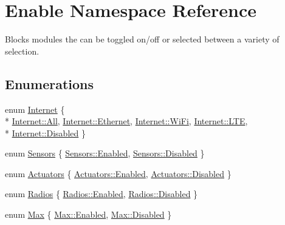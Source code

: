 \hypertarget{namespace_enable}{}\section{Enable Namespace Reference}
\label{namespace_enable}


Blocks modules the can be toggled on/off or selected between a variety of selection.  


\subsection*{Enumerations}
\begin{DoxyCompactItemize}
\item 
enum \hyperlink{namespace_enable_af24aafc1e3ae44b565ff729a2ef16a39}{Internet} \{ \\*
\hyperlink{namespace_enable_af24aafc1e3ae44b565ff729a2ef16a39ab1c94ca2fbc3e78fc30069c8d0f01680}{Internet\+::\+All}, 
\hyperlink{namespace_enable_af24aafc1e3ae44b565ff729a2ef16a39abe2ae05fb04ddcf6efa31e63e0f0e111}{Internet\+::\+Ethernet}, 
\hyperlink{namespace_enable_af24aafc1e3ae44b565ff729a2ef16a39a3bf5d41ed0ac852c9a2e2d3a1161e26d}{Internet\+::\+Wi\+Fi}, 
\hyperlink{namespace_enable_af24aafc1e3ae44b565ff729a2ef16a39acc981ecc65ecf63ad1673cbec9c64198}{Internet\+::\+L\+TE}, 
\\*
\hyperlink{namespace_enable_af24aafc1e3ae44b565ff729a2ef16a39ab9f5c797ebbf55adccdd8539a65a0241}{Internet\+::\+Disabled}
 \}
\item 
enum \hyperlink{namespace_enable_a2c5357c28618c596547602949f27e4ca}{Sensors} \{ \hyperlink{namespace_enable_a2c5357c28618c596547602949f27e4caa00d23a76e43b46dae9ec7aa9dcbebb32}{Sensors\+::\+Enabled}, 
\hyperlink{namespace_enable_a2c5357c28618c596547602949f27e4caab9f5c797ebbf55adccdd8539a65a0241}{Sensors\+::\+Disabled}
 \}
\item 
enum \hyperlink{namespace_enable_aad5ff0e67e478728f21443865359584b}{Actuators} \{ \hyperlink{namespace_enable_aad5ff0e67e478728f21443865359584ba00d23a76e43b46dae9ec7aa9dcbebb32}{Actuators\+::\+Enabled}, 
\hyperlink{namespace_enable_aad5ff0e67e478728f21443865359584bab9f5c797ebbf55adccdd8539a65a0241}{Actuators\+::\+Disabled}
 \}
\item 
enum \hyperlink{namespace_enable_adac37ec06673d08a6c6402a0feb1b232}{Radios} \{ \hyperlink{namespace_enable_adac37ec06673d08a6c6402a0feb1b232a00d23a76e43b46dae9ec7aa9dcbebb32}{Radios\+::\+Enabled}, 
\hyperlink{namespace_enable_adac37ec06673d08a6c6402a0feb1b232ab9f5c797ebbf55adccdd8539a65a0241}{Radios\+::\+Disabled}
 \}
\item 
enum \hyperlink{namespace_enable_a91b4292c74e70133aaefa8bcceec2461}{Max} \{ \hyperlink{namespace_enable_a91b4292c74e70133aaefa8bcceec2461a00d23a76e43b46dae9ec7aa9dcbebb32}{Max\+::\+Enabled}, 
\hyperlink{namespace_enable_a91b4292c74e70133aaefa8bcceec2461ab9f5c797ebbf55adccdd8539a65a0241}{Max\+::\+Disabled}
 \}
\end{DoxyCompactItemize}


